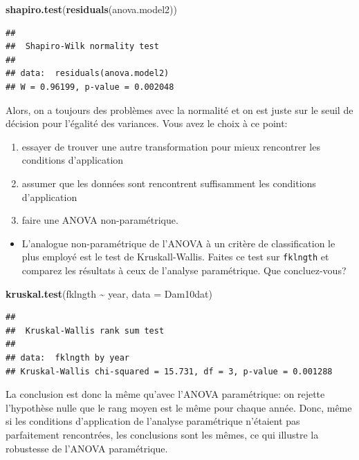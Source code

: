 \documentclass[
  12pt,
]{book}
\newenvironment{Shaded}{\begin{snugshade}}{\end{snugshade}}
\newcommand{\DataTypeTok}[1]{\textcolor[rgb]{0.13,0.29,0.53}{#1}}
\newcommand{\KeywordTok}[1]{\textcolor[rgb]{0.13,0.29,0.53}{\textbf{#1}}}
\newcommand{\NormalTok}[1]{#1}
\newcommand{\OperatorTok}[1]{\textcolor[rgb]{0.81,0.36,0.00}{\textbf{#1}}}
\newcommand{\StringTok}[1]{\textcolor[rgb]{0.31,0.60,0.02}{#1}}
\providecommand{\tightlist}{%
  \setlength{\itemsep}{0pt}\setlength{\parskip}{0pt}}
\begin{document}
\begin{Shaded}
\begin{Highlighting}[]
\KeywordTok{shapiro.test}\NormalTok{(}\KeywordTok{residuals}\NormalTok{(anova.model2))}
\end{Highlighting}
\end{Shaded}

\begin{verbatim}
## 
##  Shapiro-Wilk normality test
## 
## data:  residuals(anova.model2)
## W = 0.96199, p-value = 0.002048
\end{verbatim}

Alors, on a toujours des problèmes avec la normalité et on est juste sur le seuil de décision pour l'égalité des variances. Vous avez le choix à ce point:

\begin{enumerate}
\def\labelenumi{\arabic{enumi}.}
\tightlist
\item
  essayer de trouver une autre transformation pour mieux rencontrer les conditions d'application
\item
  assumer que les données sont rencontrent suffisamment les conditions d'application
\item
  faire une ANOVA non-paramétrique.
\end{enumerate}

\begin{itemize}
\tightlist
\item
  L'analogue non-paramétrique de l'ANOVA à un critère de classification le plus employé est le test de Kruskall-Wallis. Faites ce test sur \texttt{fklngth} et comparez les résultats à ceux de l'analyse paramétrique. Que concluez-vous?
\end{itemize}

\begin{Shaded}
\begin{Highlighting}[]
\KeywordTok{kruskal.test}\NormalTok{(fklngth }\OperatorTok{\textasciitilde{}}\StringTok{ }\NormalTok{year, }\DataTypeTok{data =}\NormalTok{ Dam10dat)}
\end{Highlighting}
\end{Shaded}

\begin{verbatim}
## 
##  Kruskal-Wallis rank sum test
## 
## data:  fklngth by year
## Kruskal-Wallis chi-squared = 15.731, df = 3, p-value = 0.001288
\end{verbatim}

La conclusion est donc la même qu'avec l'ANOVA paramétrique: on rejette l'hypothèse nulle que le rang moyen est le même pour chaque année. Donc, même si les conditions d'application de l'analyse paramétrique n'étaient pas parfaitement rencontrées, les conclusions sont les mêmes, ce qui illustre la robustesse de l'ANOVA paramétrique.
\end{document}
